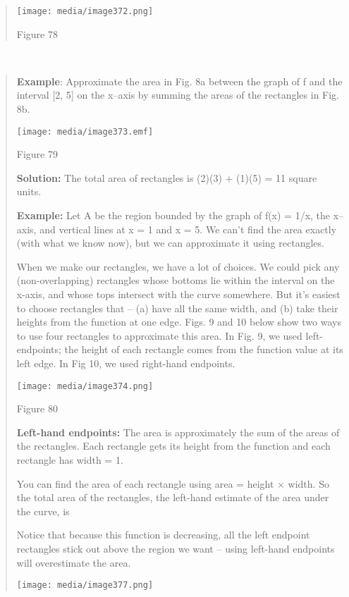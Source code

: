 \begin{quote}
\texttt{[image: media/image372.png]}

Figure 78
\end{quote}

\textbf{\\
}

\begin{quote}
\textbf{Example}: Approximate the area in Fig. 8a between the graph of f
and the interval {[}2, 5{]} on the x--axis by summing the areas of the
rectangles in Fig. 8b.

\texttt{[image: media/image373.emf]}

Figure 79

\textbf{Solution:} The total area of rectangles is (2)(3) + (1)(5) = 11
square units.

\textbf{Example:} Let A be the region bounded by the graph of f(x) =
1/x, the x--axis, and vertical lines at x = 1 and x = 5. We can't find
the area exactly (with what we know now), but we can approximate it
using rectangles.

When we make our rectangles, we have a lot of choices. We could pick any
(non-overlapping) rectangles whose bottoms lie within the interval on
the x-axis, and whose tops intersect with the curve somewhere. But it's
easiest to choose rectangles that -- (a) have all the same width, and
(b) take their heights from the function at one edge. Figs. 9 and 10
below show two ways to use four rectangles to approximate this area. In
Fig. 9, we used left-endpoints; the height of each rectangle comes from
the function value at its left edge. In Fig 10, we used right-hand
endpoints.

\texttt{[image: media/image374.png]}

Figure 80

\textbf{Left-hand endpoints:} The area is approximately the sum of the
areas of the rectangles. Each rectangle gets its height from the
function and each rectangle has width = 1.

You can find the area of each rectangle using area = height × width. So
the total area of the rectangles, the left-hand estimate of the area
under the curve, is

Notice that because this function is decreasing, all the left endpoint
rectangles stick out above the region we want -- using left-hand
endpoints will overestimate the area.

\texttt{[image: media/image377.png]}


\end{quote}

